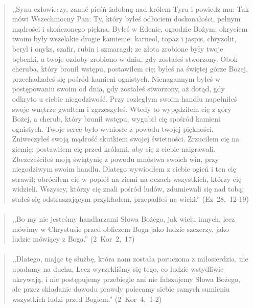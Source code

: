 \documentclass[10pt,a4paper,oneside]{article}
\begin{document}
\paragraph{}
\begin{quote}
,,Synu człowieczy, zanuć pieśń żałobną nad królem Tyru i powiedz mu: Tak mówi Wszechmocny Pan: Ty, który byłeś odbiciem doskonałości, pełnym mądrości i skończonego piękna, Byłeś w Edenie, ogrodzie Bożym; okryciem twoim były wszelakie drogie kamienie: karneol, topaz i jaspis, chryzolit, beryl i onyks, szafir, rubin i szmaragd; ze złota zrobione były twoje bębenki, a twoje ozdoby zrobiono w dniu, gdy zostałeś stworzony. Obok cheruba, który bronił wstępu, postawiłem cię; byłeś na świętej górze Bożej, przechadzałeś się pośród kamieni ognistych. Nienagannym byłeś w postępowaniu swoim od dnia, gdy zostałeś stworzony, aż dotąd, gdy odkryto u ciebie niegodziwość. Przy rozległym swoim handlu napełniłeś swoje wnętrze gwałtem i zgrzeszyłeś. Wtedy to wypędziłem cię z góry Bożej, a cherub, który bronił wstępu, wygubił cię spośród kamieni ognistych. Twoje serce było wyniosłe z powodu twojej piękności. Zniweczyłeś swoją mądrość skutkiem swojej świetności. Zrzuciłem cię na ziemię; postawiłem cię przed królami, aby się z ciebie naigrawali. Zbezcześciłeś moją świątynię z powodu mnóstwa swoich win, przy niegodziwym swoim handlu. Dlatego wywiodłem z ciebie ogień i ten cię strawił; obróciłem cię w popiół na ziemi na oczach wszystkich, którzy cię widzieli. Wszyscy, którzy cię znali pośród ludów, zdumiewali się nad tobą; stałeś się odstraszającym przykładem, przepadłeś na wieki.'' \mbox{(Ez 28, 12-19)}
\end{quote}
\paragraph{}
\begin{quote}
,,Bo my nie jesteśmy handlarzami Słowa Bożego, jak wielu innych, lecz mówimy w Chrystusie przed obliczem Boga jako ludzie szczerzy, jako ludzie mówiący z Boga.'' \mbox{(2 Kor 2, 17)}
\end{quote}
\paragraph{}
\begin{quote}
,,Dlatego, mając tę służbę, która nam została poruczona z miłosierdzia, nie upadamy na duchu, Lecz wyrzekliśmy się tego, co ludzie wstydliwie ukrywają, i nie postępujemy przebiegle ani nie fałszujemy Słowa Bożego, ale przez składanie dowodu prawdy polecamy siebie samych sumieniu wszystkich ludzi przed Bogiem.'' \mbox{(2 Kor 4, 1-2)}
\end{quote}
\end{document}

